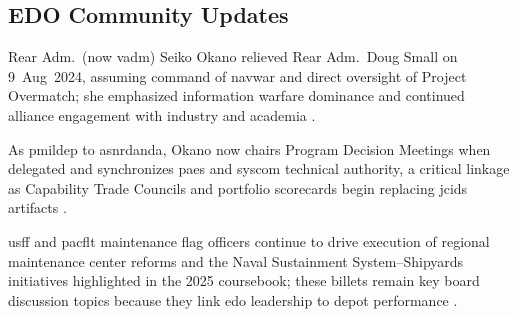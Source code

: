 \documentclass[../main.tex]{subfiles}
\begin{document}
\subsection{EDO Community Updates}
\begin{description}[style=nextline,labelsep=0.5em,font=\bfseries]
  \item[\textbf{\ac{navwar} change of command.}] Rear Adm.\ (now \ac{vadm}) Seiko Okano relieved Rear Adm.\ Doug Small on 9~Aug~2024, assuming command of \ac{navwar} and direct oversight of Project Overmatch; she emphasized information warfare dominance and continued alliance engagement with industry and academia \autocite{DVIDS-Okano-2024}.
  \item[\textbf{Role of the \ac{pmildep}.}] As \ac{pmildep} to \ac{asnrdanda}, Okano now chairs Program Decision Meetings when delegated and synchronizes \acp{pae} and \ac{syscom} technical authority, a critical linkage as Capability Trade Councils and portfolio scorecards begin replacing \ac{jcids} artifacts \autocite{SECNAV5000-2G,secwar-acq-transformation-2025}.
  \item[\textbf{Tycom maintenance focus.}] \ac{usff} and \ac{pacflt} maintenance flag officers continue to drive execution of regional maintenance center reforms and the Naval Sustainment System--Shipyards initiatives highlighted in the 2025 coursebook; these billets remain key board discussion topics because they link \ac{edo} leadership to depot performance \autocite{edo-3-3-1-acq-policy-players-2025}.
\end{description}
\end{document}
